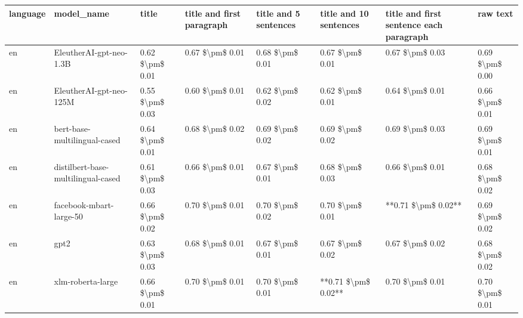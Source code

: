 \begin{tabular}{llllllll}
\toprule
language &                         model\_name &           title & title and first paragraph & title and 5 sentences & title and 10 sentences & title and first sentence each paragraph &            raw text \\
\midrule
      en &            EleutherAI-gpt-neo-1.3B & 0.62 \$\textbackslash pm\$ 0.01 &           0.67 \$\textbackslash pm\$ 0.01 &       0.68 \$\textbackslash pm\$ 0.01 &        0.67 \$\textbackslash pm\$ 0.01 &                         0.67 \$\textbackslash pm\$ 0.03 &     0.69 \$\textbackslash pm\$ 0.00 \\
      en &            EleutherAI-gpt-neo-125M & 0.55 \$\textbackslash pm\$ 0.03 &           0.60 \$\textbackslash pm\$ 0.01 &       0.62 \$\textbackslash pm\$ 0.02 &        0.62 \$\textbackslash pm\$ 0.01 &                         0.64 \$\textbackslash pm\$ 0.01 &     0.66 \$\textbackslash pm\$ 0.01 \\
      en &       bert-base-multilingual-cased & 0.64 \$\textbackslash pm\$ 0.01 &           0.68 \$\textbackslash pm\$ 0.02 &       0.69 \$\textbackslash pm\$ 0.02 &        0.69 \$\textbackslash pm\$ 0.02 &                         0.69 \$\textbackslash pm\$ 0.03 &     0.69 \$\textbackslash pm\$ 0.01 \\
      en & distilbert-base-multilingual-cased & 0.61 \$\textbackslash pm\$ 0.03 &           0.66 \$\textbackslash pm\$ 0.01 &       0.67 \$\textbackslash pm\$ 0.01 &        0.68 \$\textbackslash pm\$ 0.03 &                         0.66 \$\textbackslash pm\$ 0.01 &     0.68 \$\textbackslash pm\$ 0.02 \\
      en &            facebook-mbart-large-50 & 0.66 \$\textbackslash pm\$ 0.02 &           0.70 \$\textbackslash pm\$ 0.01 &       0.70 \$\textbackslash pm\$ 0.02 &        0.70 \$\textbackslash pm\$ 0.01 &                     **0.71 \$\textbackslash pm\$ 0.02** &     0.69 \$\textbackslash pm\$ 0.02 \\
      en &                               gpt2 & 0.63 \$\textbackslash pm\$ 0.03 &           0.68 \$\textbackslash pm\$ 0.01 &       0.67 \$\textbackslash pm\$ 0.01 &        0.67 \$\textbackslash pm\$ 0.02 &                         0.67 \$\textbackslash pm\$ 0.02 &     0.68 \$\textbackslash pm\$ 0.02 \\
      en &                  xlm-roberta-large & 0.66 \$\textbackslash pm\$ 0.01 &           0.70 \$\textbackslash pm\$ 0.01 &       0.70 \$\textbackslash pm\$ 0.01 &    **0.71 \$\textbackslash pm\$ 0.02** &                         0.70 \$\textbackslash pm\$ 0.01 &     0.70 \$\textbackslash pm\$ 0.01 \\

\end{tabular}
